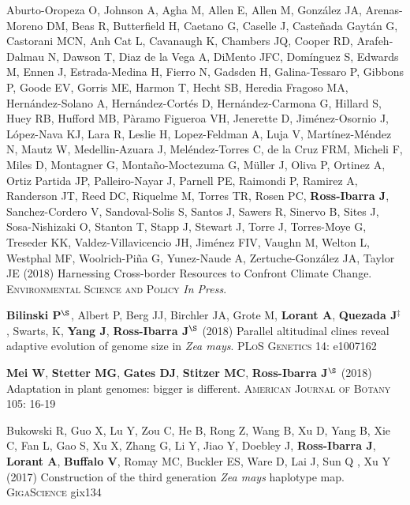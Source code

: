 \begin{etaremune}
\item  Aburto-Oropeza O, Johnson A, Agha M, Allen E,  Allen M,  Gonz\'{a}lez JA, Arenas-Moreno DM, Beas R, Butterfield H, Caetano G, Caselle J, Caste\~{n}ada Gayt\'{a}n G, Castorani MCN, Anh Cat L, Cavanaugh K, Chambers JQ, Cooper RD, Arafeh-Dalmau N, Dawson T, Diaz de la Vega A, DiMento JFC, Dom\'{i}nguez S, Edwards M, Ennen J, Estrada-Medina H, Fierro N, Gadsden H, Galina-Tessaro P, Gibbons P, Goode EV, Gorris ME, Harmon T, Hecht SB, Heredia Fragoso MA, Hern\'{a}ndez-Solano A, Hern\'{a}ndez-Cort\'{e}s D, Hern\'{a}ndez-Carmona G, Hillard S, Huey RB, Hufford MB, P\`{a}ramo Figueroa VH, Jenerette D, Jim\'{e}nez-Osornio J, L\'{o}pez-Nava KJ, Lara R, Leslie H, Lopez-Feldman A, Luja V, Mart\'{i}nez-M\'{e}ndez N, Mautz W, Medellin-Azuara J, Mel\'{e}ndez-Torres C, de la Cruz FRM,  Micheli F, Miles D, Montagner G, Monta\~{n}o-Moctezuma G, M\"{u}ller J, Oliva P, Ortinez A, Ortiz Partida JP, Palleiro-Nayar J, Parnell PE, Raimondi P, Ramirez A, Randerson JT, Reed DC, Riquelme M, Torres TR, Rosen PC, {\bf Ross-Ibarra J}, Sanchez-Cordero V, Sandoval-Solis S, Santos J, Sawers R, Sinervo B, Sites J,  Sosa-Nishizaki O, Stanton T, Stapp J, Stewart J, Torre J,  Torres-Moye G, Treseder KK, Valdez-Villavicencio JH, Jim\'{e}nez FIV, Vaughn M, Welton L, Westphal MF, Woolrich-Pi\~{n}a G,  Yunez-Naude A, Zertuche-Gonz\'{a}lez JA, Taylor JE (2018)
Harnessing Cross-border Resources to Confront Climate Change.  \textsc{Environmental Science and Policy} \textit{In Press}.

\item \textbf{Bilinski P}$^\S$, Albert P, Berg JJ, Birchler JA, Grote M, \textbf{Lorant A}, \textbf{Quezada J}$^\ddagger$, Swarts, K, \textbf{Yang J}, \textbf{Ross-Ibarra J}$^\S$ (2018) Parallel altitudinal clines reveal adaptive evolution of genome size in \textit{Zea mays}. \textsc{PLoS Genetics} 14: e1007162

\item {\bf Mei W}, {\bf Stetter MG}, {\bf Gates DJ}, {\bf Stitzer MC}, {\bf Ross-Ibarra J}$^\S$ (2018) Adaptation in plant genomes: bigger is different.  \textsc{American Journal of Botany} 105: 16-19

\item Bukowski R, Guo X, Lu Y, Zou C, He B, Rong Z, Wang B,  Xu D,  Yang B, Xie C,  Fan L, Gao S, Xu X, Zhang G, Li Y, Jiao Y, Doebley J, {\bf Ross-Ibarra J}, {\bf Lorant A}, {\bf Buffalo V}, Romay MC, Buckler ES, Ware D, Lai J, Sun Q , Xu Y (2017) Construction of the third generation \emph{Zea mays} haplotype map. \textsc{GigaScience} gix134


\end{etaremune}
